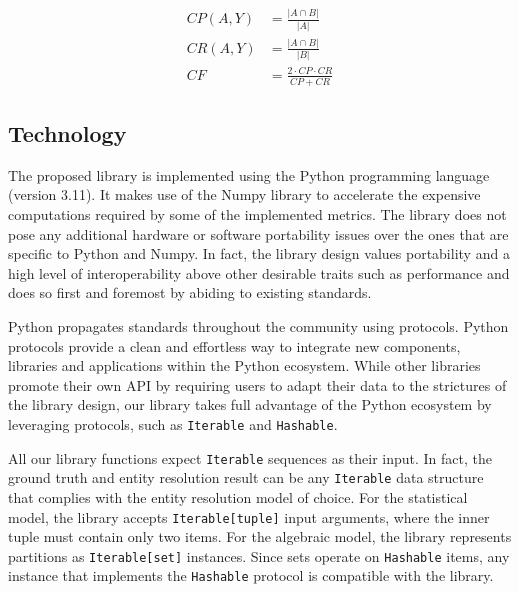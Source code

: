 \documentclass[a4paper,twoside]{article}
\begin{document}
    \begin{align*}
        CP(A, Y) &= \frac{|{A}\cap{B}|}{|A|}\\
        CR(A, Y) &= \frac{|{A}\cap{B}|}{|B|}\\
        CF &= \frac{2\cdot{CP}\cdot{CR}}{CP + CR}
    \end{align*}

    \subsection{Technology}\label{sec:tech}

    The proposed library is implemented using the Python programming
    language (version 3.11)\cite{python}.
    It makes use of the Numpy library\cite{harris2020numpy} to accelerate
    the expensive computations required by some of the implemented metrics.
    The library does not pose any additional hardware or software portability
    issues over the ones that are specific to Python and Numpy.
    In fact, the library design values portability and a high level of
    interoperability above other desirable traits such as performance and does
    so first and foremost by abiding to existing standards.

    Python propagates standards throughout the community using protocols.
    Python protocols\cite{pyproto2017} provide a clean and effortless way to
    integrate new components, libraries and applications within the Python
    ecosystem.
    While other libraries\cite{nmeth2020scipy} promote their own API by
    requiring users to adapt their data to the strictures of the library design,
    our library takes full advantage of the Python ecosystem by leveraging
    protocols, such as \texttt{Iterable} and \texttt{Hashable}.

    All our library functions expect \texttt{Iterable} sequences as their input.
    In fact, the ground truth and entity resolution result can be any
    \texttt{Iterable} data structure that complies with the entity resolution
    model of choice.
    For the statistical model, the library accepts \texttt{Iterable[tuple]}
    input arguments, where the inner tuple must contain only two items.
    For the algebraic model, the library represents partitions as
    \texttt{Iterable[set]} instances.
    Since sets operate on \texttt{Hashable} items, any instance that implements
    the \texttt{Hashable} protocol is compatible with the library.
    
\end{document}
